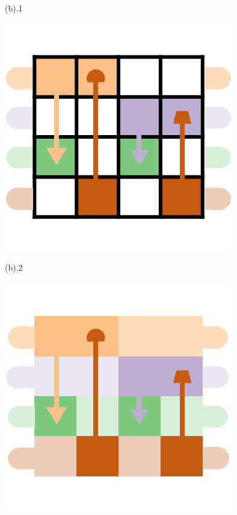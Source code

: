 \documentclass[review,journal]{vgtc}         %
\begin{document}
\begin{figure}[h]
\begin{minipage}{0.24\linewidth}
		\vspace{-1pt}
		\centerline{(b).1}
		\centerline{\includegraphics[width=\textwidth]{Fig/22.png}}
		\vspace{-1pt}
		\centerline{(b).2}
		\centerline{\includegraphics[width=\textwidth]{Fig/23.png}}

\end{minipage}
\end{figure}
\end{document}
